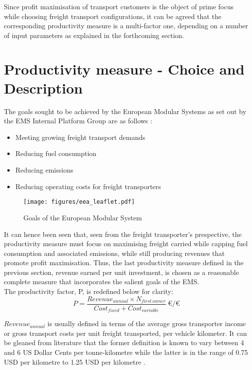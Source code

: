 \documentclass[ExampleMasters.tex]{subfiles}
\begin{document}
		Since profit maximisation of transport customers is the object of prime focus while choosing freight transport configurations, it can be agreed that the corresponding productivity measure is a multi-factor one, depending on a number of input parameters as explained in the forthcoming section.\\

	\section{Productivity measure - Choice and Description}

		The goals sought to be achieved by the European Modular Systems as set out by the EMS Internal Platform Group are as follows \cite{EMSleaflet}:
		\begin{itemize}
			\item Meeting growing freight transport demands
			\item Reducing fuel consumption
			\item Reducing emissions
			\item Reducing operating costs for freight transporters
		\end{itemize}

		\begin{figure}[h!]
			\centering
			\texttt{[image: figures/eea\_leaflet.pdf]}
			\caption{Goals of the European Modular System \cite{EMSleaflet}}
			\label{EMSleaflet}
		\end{figure}

		It can hence been seen that, seen from the freight transporter's prespective, the productivity measure must focus on maximising freight carried while capping fuel consumption and associated emissions, while still producing revenues that promote profit maximisation. Thus, the last productivity measure defined in the previous section, revenue earned per unit investment, is chosen as a reasonable complete measure that incorporates the salient goals of the EMS.\\ 

		The productivity factor, P, is redefined below for clarity:
		\begin{equation} \label{eq:productivity}
			P = \frac{Revenue_{annual} \times N_{first\ owner}}{Cost_{fixed} + Cost_{variable}}\ \euro/\euro
		\end{equation}

		$Revenue_{annual}$ is usually defined in terms of the average gross transporter income or gross transport costs per unit freight transported, per vehicle kilometer. It can be gleaned from literature that the former definition is known to vary between 4 and 6 US Dollar Cents per tonne-kilometre \cite{WorldBankReport} while the latter is in the range of 0.75 USD per kilometre to 1.25 USD per kilometre \cite{WorldBankReport}.\\
\end{document}
